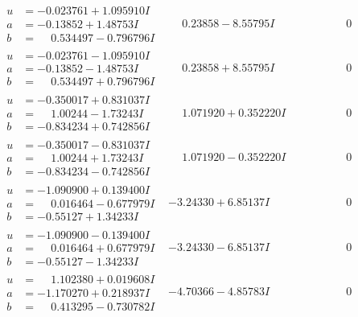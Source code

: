 \documentclass[1p]{elsarticle_modified}
\theoremstyle{definition}
\begin{document}
$$\begin{array}{c|c|c}
\begin{aligned}
u &= -0.023761 + 1.095910 I \\
a &= -0.13852 + 1.48753 I \\
b &= \phantom{-}0.534497 - 0.796796 I\end{aligned}
 & \phantom{-}0.23858 - 8.55795 I & \phantom{-0.000000 } 0 \\ \hline\begin{aligned}
u &= -0.023761 - 1.095910 I \\
a &= -0.13852 - 1.48753 I \\
b &= \phantom{-}0.534497 + 0.796796 I\end{aligned}
 & \phantom{-}0.23858 + 8.55795 I & \phantom{-0.000000 } 0 \\ \hline\begin{aligned}
u &= -0.350017 + 0.831037 I \\
a &= \phantom{-}1.00244 - 1.73243 I \\
b &= -0.834234 + 0.742856 I\end{aligned}
 & \phantom{-}1.071920 + 0.352220 I & \phantom{-0.000000 } 0 \\ \hline\begin{aligned}
u &= -0.350017 - 0.831037 I \\
a &= \phantom{-}1.00244 + 1.73243 I \\
b &= -0.834234 - 0.742856 I\end{aligned}
 & \phantom{-}1.071920 - 0.352220 I & \phantom{-0.000000 } 0 \\ \hline\begin{aligned}
u &= -1.090900 + 0.139400 I \\
a &= \phantom{-}0.016464 - 0.677979 I \\
b &= -0.55127 + 1.34233 I\end{aligned}
 & -3.24330 + 6.85137 I & \phantom{-0.000000 } 0 \\ \hline\begin{aligned}
u &= -1.090900 - 0.139400 I \\
a &= \phantom{-}0.016464 + 0.677979 I \\
b &= -0.55127 - 1.34233 I\end{aligned}
 & -3.24330 - 6.85137 I & \phantom{-0.000000 } 0 \\ \hline\begin{aligned}
u &= \phantom{-}1.102380 + 0.019608 I \\
a &= -1.170270 + 0.218937 I \\
b &= \phantom{-}0.413295 - 0.730782 I\end{aligned}
 & -4.70366 - 4.85783 I & \phantom{-0.000000 } 0 \\ \hline\begin{aligned}

\end{aligned}
\end{array}$$
\end{document}
